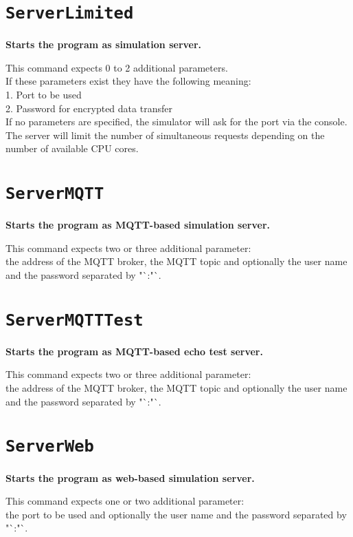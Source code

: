 \section{\texttt{ServerLimited}}

\textbf{Starts the program as simulation server.}

This command expects 0 to 2 additional parameters.\\
If these parameters exist they have the following meaning:\\
1. Port to be used\\
2. Password for encrypted data transfer\\
If no parameters are specified, the simulator will ask for the port via the console.\\
The server will limit the number of simultaneous requests depending on the\\
number of available CPU cores.

\section{\texttt{ServerMQTT}}

\textbf{Starts the program as MQTT-based simulation server.}

This command expects two or three additional parameter:\\
the address of the MQTT broker, the MQTT topic and optionally the user name and the password separated by "`:"`.

\section{\texttt{ServerMQTTTest}}

\textbf{Starts the program as MQTT-based echo test server.}

This command expects two or three additional parameter:\\
the address of the MQTT broker, the MQTT topic and optionally the user name and the password separated by "`:"`.

\section{\texttt{ServerWeb}}

\textbf{Starts the program as web-based simulation server.}

This command expects one or two additional parameter:\\
the port to be used and optionally the user name and the password separated by "`:"`.

